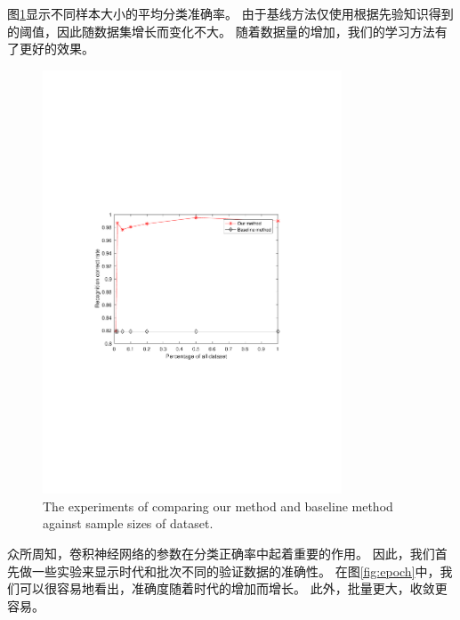 图\ref{fig:sizes}显示不同样本大小的平均分类准确率。 由于基线方法仅使用根据先验知识得到的阈值，因此随数据集增长而变化不大。 随着数据量的增加，我们的学习方法有了更好的效果。
\begin{figure}[!t]
	\centering
	\includegraphics[width=3.5in]{figures/sizes}
	\caption{The experiments of comparing our method and baseline method against sample sizes of dataset.}
	\label{fig:sizes}
\end{figure}
众所周知，卷积神经网络的参数在分类正确率中起着重要的作用。 因此，我们首先做一些实验来显示时代和批次不同的验证数据的准确性。 在图\ref{fig:epoch}中，我们可以很容易地看出，准确度随着时代的增加而增长。 此外，批量更大，收敛更容易。

